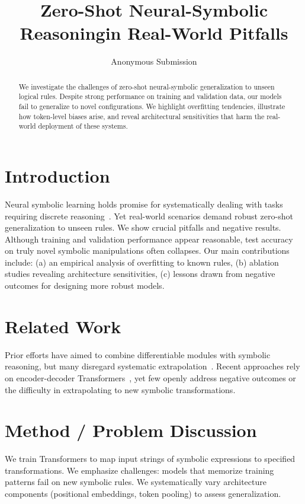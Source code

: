 \documentclass[11pt]{article}
\title{\bf Zero-Shot Neural-Symbolic Reasoning\newline in Real-World Pitfalls}
\author{Anonymous Submission}
\date{}
\begin{document}
\maketitle

\begin{abstract}
We investigate the challenges of zero-shot neural-symbolic generalization to unseen logical rules. Despite strong performance on training and validation data, our models fail to generalize to novel configurations. We highlight overfitting tendencies, illustrate how token-level biases arise, and reveal architectural sensitivities that harm the real-world deployment of these systems.
\end{abstract}

\section{Introduction}
Neural symbolic learning holds promise for systematically dealing with tasks requiring discrete reasoning~\citep{lecun1989backpropagation,vaswani2017attention}. Yet real-world scenarios demand robust zero-shot generalization to unseen rules. We show crucial pitfalls and negative results. Although training and validation performance appear reasonable, test accuracy on truly novel symbolic manipulations often collapses. Our main contributions include: (a) an empirical analysis of overfitting to known rules, (b) ablation studies revealing architecture sensitivities, (c) lessons drawn from negative outcomes for designing more robust models.

\section{Related Work}
Prior efforts have aimed to combine differentiable modules with symbolic reasoning, but many disregard systematic extrapolation~\citep{brown2020gpt3}. Recent approaches rely on encoder-decoder Transformers~\citep{vaswani2017attention}, yet few openly address negative outcomes or the difficulty in extrapolating to new symbolic transformations.

\section{Method / Problem Discussion}
We train Transformers to map input strings of symbolic expressions to specified transformations. We emphasize challenges: models that memorize training patterns fail on new symbolic rules. We systematically vary architecture components (positional embeddings, token pooling) to assess generalization.
\end{document}
